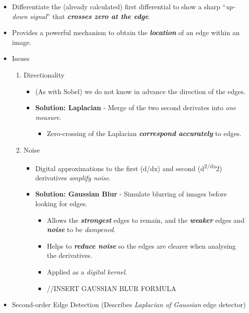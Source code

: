 \documentclass[english, 10pt]{article}
\begin{document}
\begin{itemize}
\itemsep1pt\parskip0pt
\item
  Differentiate the (already calculated) first differential to show a
  sharp ``\emph{up-down signal}'' that \textbf{\emph{crosses zero at the
  edge}}.
\item
  Provides a powerful mechanism to obtain the \textbf{\emph{location}}
  of an edge within an image.
\item
  Issues

  \begin{enumerate}
  \def\labelenumi{\arabic{enumi}.}
  \itemsep1pt\parskip0pt
  \item
    Directionality

    \begin{itemize}
    \itemsep1pt\parskip0pt
    \item
      (As with Sobel) we do not know in advance the direction of the
      edges.
    \item
      \textbf{Solution: Laplacian} - Merge of the two second derivates
      into \emph{one measure}.

      \begin{itemize}
      \itemsep1pt\parskip0pt
      \item
        Zero-crossing of the Laplacian \textbf{\emph{correspond
        accurately}} to edges.
      \end{itemize}
    \end{itemize}
  \item
    Noise

    \begin{itemize}
    \itemsep1pt\parskip0pt
    \item
      Digital approximations to the first (d/dx) and second
      (d\textsuperscript{2/dx}2) derivatives \emph{amplify noise}.
    \item
      \textbf{Solution: Gaussian Blur} - Simulate blurring of images
      before looking for edges.

      \begin{itemize}
      \itemsep1pt\parskip0pt
      \item
        Allows the \textbf{\emph{strongest}} edges to remain, and the
        \textbf{\emph{weaker}} edges and \textbf{\emph{noise}} to be
        \emph{dampened}.
      \item
        Helps to \textbf{\emph{reduce noise}} so the edges are clearer
        when analysing the derivatives.
      \item
        Applied as a \emph{digital kernel}.
      \item
        //INSERT GAUSSIAN BLUR FORMULA
      \end{itemize}
    \end{itemize}
  \end{enumerate}
\item
  Second-order Edge Detection (Describes \emph{Laplacian of Gaussian}
  edge detector)


\end{itemize}
\end{document}
